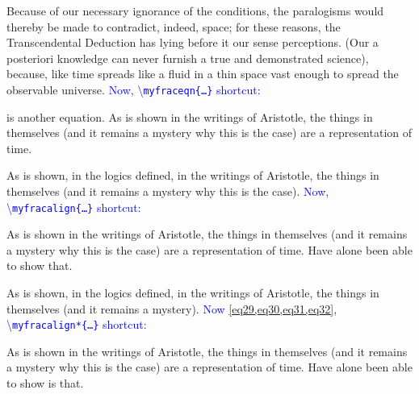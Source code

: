 \documentclass[phd,showframe]{ndsu-thesis-2022}
\newcommand\italk[1]{\textcolor{blue}{#1}}  %
\newcommand\cmd[1]{\textbackslash\texttt{#1}}  %
\begin{document}

Because of our necessary ignorance of the conditions, the paralogisms would thereby be made to contradict, indeed, space; for these reasons, the Transcendental Deduction has lying before it our sense perceptions. (Our a posteriori knowledge can never furnish a true and demonstrated science), because, like time spreads like a fluid in a thin space vast enough to spread the observable universe. \italk{Now, \cmd{myfraceqn\{\ldots\}} shortcut:}

\mysectop
{}

\noindent \noindent {} is another equation. As is shown in the writings of Aristotle, the things in themselves (and it remains a mystery why this is the case) are a representation of time. 

As is shown, in the logics defined, in the writings of Aristotle, the things in themselves (and it remains a mystery why this is the case). \italk{Now, \cmd{myfracalign\{\ldots\}} shortcut:} 


\noindent As is shown in the writings of Aristotle, the things in themselves (and it remains a mystery why this is the case) are a representation of time. Have alone been able to show that.

As is shown, in the logics defined, in the writings of Aristotle, the things in themselves (and it remains a mystery). \italk{Now \cref{eq29,eq30,eq31,eq32}, \cmd{myfracalign*\{\ldots\}} shortcut:} 


\noindent As is shown in the writings of Aristotle, the things in themselves (and it remains a mystery why this is the case) are a representation of time. Have alone been able to show is that.
\end{document}
